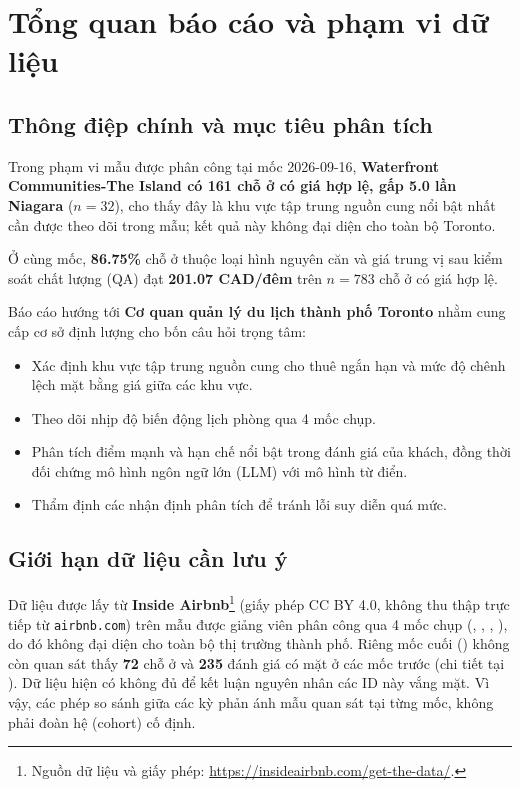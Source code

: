 \FloatBarrier
\section{Tổng quan báo cáo và phạm vi dữ liệu}

\subsection{Thông điệp chính và mục tiêu phân tích}

Trong phạm vi mẫu được phân công tại mốc 2026-09-16, \textbf{Waterfront Communities-The Island có 161 chỗ ở có giá hợp lệ, gấp 5.0 lần Niagara} ($n=32$), cho thấy đây là khu vực tập trung nguồn cung nổi bật nhất cần được theo dõi trong mẫu; kết quả này không đại diện cho toàn bộ Toronto.

Ở cùng mốc, \textbf{86.75\%} chỗ ở thuộc loại hình nguyên căn và giá trung vị sau kiểm soát chất lượng (QA) đạt \textbf{201.07 CAD/đêm} trên $n=783$ chỗ ở có giá hợp lệ.

Báo cáo hướng tới \textbf{Cơ quan quản lý du lịch thành phố Toronto} nhằm cung cấp cơ sở định lượng cho bốn câu hỏi trọng tâm:
\begin{itemize}
\item Xác định khu vực tập trung nguồn cung cho thuê ngắn hạn và mức độ chênh lệch mặt bằng giá giữa các khu vực.
\item Theo dõi nhịp độ biến động lịch phòng qua 4 mốc chụp.
\item Phân tích điểm mạnh và hạn chế nổi bật trong đánh giá của khách, đồng thời đối chứng mô hình ngôn ngữ lớn (LLM) với mô hình từ điển.
\item Thẩm định các nhận định phân tích để tránh lỗi suy diễn quá mức.
\end{itemize}

\subsection{Giới hạn dữ liệu cần lưu ý}

Dữ liệu được lấy từ \textbf{Inside Airbnb}\footnote{Nguồn dữ liệu và giấy phép: \url{https://insideairbnb.com/get-the-data/}.} (giấy phép CC BY 4.0, không thu thập trực tiếp từ \texttt{airbnb.com}) trên mẫu được giảng viên phân công qua 4 mốc chụp (, , , ), do đó không đại diện cho toàn bộ thị trường thành phố. Riêng mốc cuối () không còn quan sát thấy \textbf{72} chỗ ở và \textbf{235} đánh giá có mặt ở các mốc trước (chi tiết tại ). Dữ liệu hiện có không đủ để kết luận nguyên nhân các ID này vắng mặt. Vì vậy, các phép so sánh giữa các kỳ phản ánh mẫu quan sát tại từng mốc, không phải đoàn hệ (cohort) cố định.

